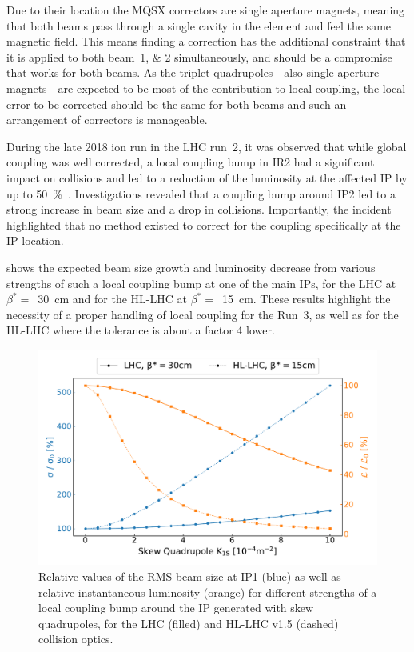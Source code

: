 Due to their location the MQSX correctors are single aperture magnets, meaning that both beams pass through a single cavity in the element and feel the same magnetic field.
This means finding a correction has the additional constraint that it is applied to both beam~\numlist{1;2} simultaneously, and should be a compromise that works for both beams.
As the triplet quadrupoles - also single aperture magnets - are expected to be most of the contribution to local coupling, the local error to be corrected should be the same for both beams and such an arrangement of correctors is manageable.

During the late \num{2018} ion run in the LHC \Gls{run}~\num{2}, it was observed that while global coupling was well corrected, a local coupling bump in IR\num{2} had a significant impact on collisions and led to a reduction of the luminosity at the affected IP by up to \qty{50}{\percent}~\cite{IPAC:Jowett:LHC_2018_Heavy_Ion_Run, IPAC:Tomas:Run2_Experience_View_LHC_HLLHC, CERN:Persson:LHCOpticsCorrectionsEvian2019}.
Investigations revealed that a coupling bump around IP\num{2} led to a strong increase in beam size and a drop in collisions.
Importantly, the incident highlighted that no method existed to correct for the coupling specifically at the IP location.

 shows the expected beam size growth and luminosity decrease from various strengths of such a local coupling bump at one of the main IPs, for the LHC at \(\beta^{*}=\)~\qty{30}{\centi\meter} and for the \acrshort{HL-LHC} at \(\beta^{*}=\)~\qty{15}{\centi\meter}.
These results highlight the necessity of a proper handling of local coupling for the Run~\num{3}, as well as for the HL-LHC where the tolerance is about a factor \num{4} lower.

\begin{figure}[!htb]
    \centering
    \includegraphics*[width=\textwidth]{Figures/IR_Coupling_Correction/lhc_vs_hllhc_combined.pdf}
    \caption{Relative values of the RMS beam size at IP\num{1} (\textcolor{mplblue}{blue}) as well as relative instantaneous luminosity (\textcolor{mplorange}{orange}) for different strengths of a local coupling bump around the IP generated with skew quadrupoles, for the LHC (filled) and HL-LHC v1.5 (dashed) collision optics.}
    \label{figure:lhc_vs_hllhc_beam_size_and_lumi_growths}
\end{figure}

